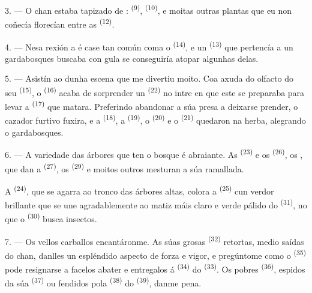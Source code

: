 3. --- O chan estaba tapizado de : 
\textsuperscript{(9)},  \textsuperscript{(10)}, e moitas outras
plantas que eu non coñecía florecían entre as 
\textsuperscript{(12)}.

4. --- Nesa rexión a  é case tan común coma o 
\textsuperscript{(14)}, e un  \textsuperscript{(13)} que pertencía a
un gardabosques buscaba con gula se conseguiría atopar algunhas delas.

\VUsaut{3.0mm}
\VUsaut{3.0mm}

5. --- Asistín ao  dunha escena que me divertiu moito. Coa axuda do
olfacto do seu  \textsuperscript{(15)}, o 
\textsuperscript{(16)} acaba de sorprender un 
\textsuperscript{(22)} no intre en que este se preparaba para levar a 
\textsuperscript{(17)} que matara. Preferindo abandonar a súa presa a deixarse
prender, o cazador furtivo fuxira, e a  \textsuperscript{(18)}, a
 \textsuperscript{(19)}, o  \textsuperscript{(20)} e o
 \textsuperscript{(21)} quedaron na herba, alegrando o gardabosques.

6. --- A variedade das árbores que ten o bosque é abraiante. As 
\textsuperscript{(23)} e os  \textsuperscript{(26)}, os
, que dan a  \textsuperscript{(27)}, os
 \textsuperscript{(29)} e moitos outros mesturan a súa ramallada.

A  \textsuperscript{(24)}, que se agarra ao tronco das árbores altas,
colora a  \textsuperscript{(25)} cun verdor brillante que se une
agradablemente ao matiz máis claro e verde pálido do 
\textsuperscript{(31)}, no que o  \textsuperscript{(30)} busca
insectos.

\VUsaut{3.0mm}
\VUsaut{3.0mm}

7. --- Os vellos carballos encantáronme. As súas grosas 
\textsuperscript{(32)} retortas, medio saídas do chan, danlles un espléndido aspecto de
forza e vigor, e pregúntome como o  \textsuperscript{(35)} pode
resignarse a facelos abater e entregalos á  \textsuperscript{(34)} do
 \textsuperscript{(33)}. Os pobres 
\textsuperscript{(36)}, espidos da súa  \textsuperscript{(37)} ou
fendidos pola  \textsuperscript{(38)} do 
\textsuperscript{(39)}, danme pena.

